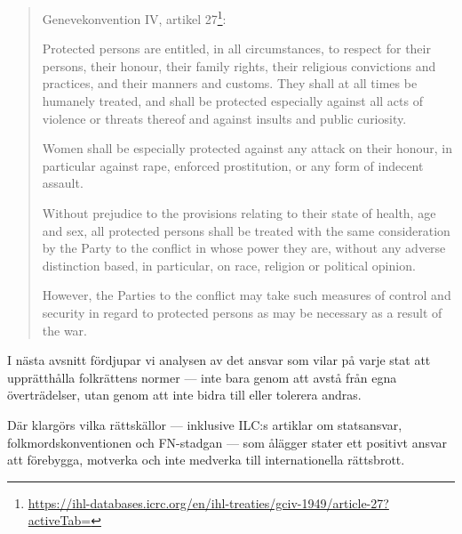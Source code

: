 
\begin{quote}
Genevekonvention IV, artikel 27\footnote{\url{https://ihl-databases.icrc.org/en/ihl-treaties/gciv-1949/article-27?activeTab=}}:

Protected persons are entitled, in all circumstances, to respect for their persons, their honour, their family rights, their religious convictions and practices, and their manners and customs. They shall at all times be humanely treated, and shall be protected especially against all acts of violence or threats thereof and against insults and public curiosity.

Women shall be especially protected against any attack on their honour, in particular against rape, enforced prostitution, or any form of indecent assault.

Without prejudice to the provisions relating to their state of health, age and sex, all protected persons shall be treated with the same consideration by the Party to the conflict in whose power they are, without any adverse distinction based, in particular, on race, religion or political opinion.

However, the Parties to the conflict may take such measures of control and security in regard to protected persons as may be necessary as a result of the war.
\end{quote}


\medskip

\medskip

\noindent
I nästa avsnitt fördjupar vi analysen av det ansvar som vilar på varje stat att upprätthålla folkrättens normer — inte bara genom att avstå från egna överträdelser, utan genom att inte bidra till eller tolerera andras. 

Där klargörs vilka rättskällor — inklusive ILC:s artiklar om statsansvar, folkmordskonventionen och FN-stadgan — som ålägger stater ett positivt ansvar att förebygga, motverka och inte medverka till internationella rättsbrott.






















